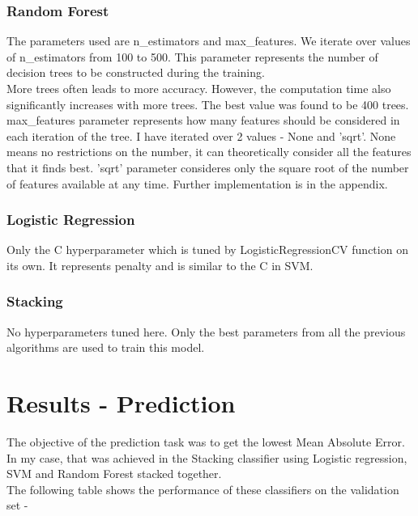 \documentclass[12pt]{article}
\theoremstyle{definition}
\begin{document}
\subsubsection{Random Forest}
The parameters used are n\_estimators and max\_features. We iterate over values of n\_estimators from 100 to 500. This parameter represents the number of decision trees to be constructed during the training. \\

More trees often leads to more accuracy. However, the computation time also significantly increases with more trees. The best value was found to be 400 trees. \\

max\_features parameter represents how many features should be considered in each iteration of the tree. I have iterated over 2 values - None and 'sqrt'. None means no restrictions on the number, it can theoretically consider all the features that it finds best. 'sqrt' parameter consideres only the square root of the number of features available at any time. Further implementation is in the appendix.

\subsubsection{Logistic Regression}
Only the C hyperparameter which is tuned by LogisticRegressionCV function on its own. It represents penalty and is similar to the C in SVM. 

\subsubsection{Stacking}
No hyperparameters tuned here. Only the best parameters from all the previous algorithms are used to train this model.

\section{Results - Prediction}

The objective of the prediction task was to get the lowest Mean Absolute Error. In my case, that was achieved in the Stacking classifier using Logistic regression, SVM and Random Forest stacked together. \\

The following table shows the performance of these classifiers on the validation set - 
\begin{center}
    
\end{center}
\end{document}
